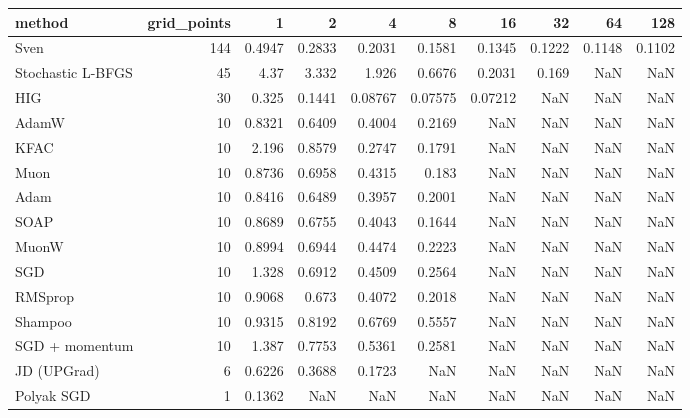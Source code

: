 \begin{tabular}{lrrrrrrrrr}
\toprule
method & grid\_points & 1 & 2 & 4 & 8 & 16 & 32 & 64 & 128 \\
\midrule
Sven & 144 & 0.4947 & 0.2833 & 0.2031 & 0.1581 & 0.1345 & 0.1222 & 0.1148 & 0.1102 \\
Stochastic L-BFGS & 45 & 4.37 & 3.332 & 1.926 & 0.6676 & 0.2031 & 0.169 & NaN & NaN \\
HIG & 30 & 0.325 & 0.1441 & 0.08767 & 0.07575 & 0.07212 & NaN & NaN & NaN \\
AdamW & 10 & 0.8321 & 0.6409 & 0.4004 & 0.2169 & NaN & NaN & NaN & NaN \\
KFAC & 10 & 2.196 & 0.8579 & 0.2747 & 0.1791 & NaN & NaN & NaN & NaN \\
Muon & 10 & 0.8736 & 0.6958 & 0.4315 & 0.183 & NaN & NaN & NaN & NaN \\
Adam & 10 & 0.8416 & 0.6489 & 0.3957 & 0.2001 & NaN & NaN & NaN & NaN \\
SOAP & 10 & 0.8689 & 0.6755 & 0.4043 & 0.1644 & NaN & NaN & NaN & NaN \\
MuonW & 10 & 0.8994 & 0.6944 & 0.4474 & 0.2223 & NaN & NaN & NaN & NaN \\
SGD & 10 & 1.328 & 0.6912 & 0.4509 & 0.2564 & NaN & NaN & NaN & NaN \\
RMSprop & 10 & 0.9068 & 0.673 & 0.4072 & 0.2018 & NaN & NaN & NaN & NaN \\
Shampoo & 10 & 0.9315 & 0.8192 & 0.6769 & 0.5557 & NaN & NaN & NaN & NaN \\
SGD + momentum & 10 & 1.387 & 0.7753 & 0.5361 & 0.2581 & NaN & NaN & NaN & NaN \\
JD (UPGrad) & 6 & 0.6226 & 0.3688 & 0.1723 & NaN & NaN & NaN & NaN & NaN \\
Polyak SGD & 1 & 0.1362 & NaN & NaN & NaN & NaN & NaN & NaN & NaN \\
\bottomrule
\end{tabular}
